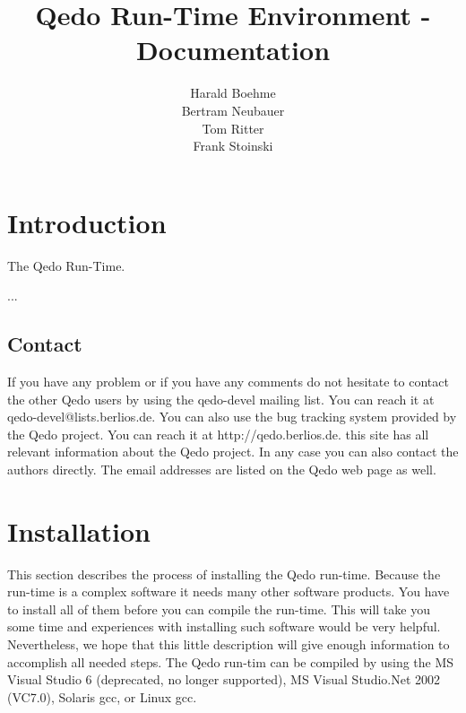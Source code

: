 \documentclass[12pt,a4paper]{report}
\begin{document}
\title{Qedo Run-Time Environment - Documentation}
\author{Harald Boehme \\ Bertram Neubauer \\ Tom Ritter \\ Frank Stoinski}

\maketitle

\setcounter{page}{1} 

\tableofcontents


\chapter{Introduction}
\label{sec:Introduction}

The Qedo Run-Time.

...

\section{Contact}
\label{sec:Contact}

If you have any problem or if you have any comments do not hesitate to contact the other Qedo users by using the qedo-devel mailing list. You can reach it at qedo-devel@lists.berlios.de. You can also use the bug tracking system provided by the Qedo project. You can reach it at http://qedo.berlios.de. this site has all relevant information about the Qedo project. In any case you can also contact the authors directly. The email addresses are listed on the Qedo web page as well.


\chapter{Installation}
\label{sec:Installation}


This section describes the process of installing the Qedo run-time. Because the run-time is a complex software it needs many other software products. You have to install all of them before you can compile the run-time. This will take you some time and experiences with installing such software would be very helpful. Nevertheless, we hope that this little description will give enough information to accomplish all needed steps. 
The Qedo run-tim can be compiled by using the MS Visual Studio 6 (deprecated, no longer supported), MS Visual Studio.Net 2002 (VC7.0), Solaris gcc, or Linux gcc.
\end{document}
